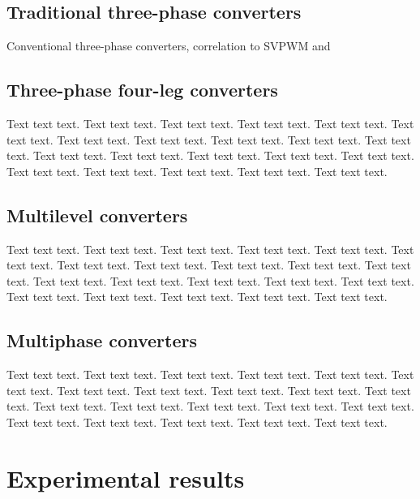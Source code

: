 \documentclass[journal]{IEEEtranTIE}
\theoremstyle{definition}
\begin{document}
\subsection{Traditional three-phase converters}

Conventional three-phase converters, correlation to SVPWM and 

\subsection{Three-phase four-leg converters}

Text text text. Text text text. Text text text. Text text text. Text
text text. Text text text. Text text text. Text text text. Text text
text. Text text text. Text text text. Text text text. Text text text.
Text text text. Text text text. Text text text. Text text text. Text
text text. Text text text. Text text text. Text text text.

\subsection{Multilevel converters}

Text text text. Text text text. Text text text. Text text text. Text
text text. Text text text. Text text text. Text text text. Text text
text. Text text text. Text text text. Text text text. Text text text.
Text text text. Text text text. Text text text. Text text text. Text
text text. Text text text. Text text text. Text text text.

\subsection{Multiphase converters}

Text text text. Text text text. Text text text. Text text text. Text
text text. Text text text. Text text text. Text text text. Text text
text. Text text text. Text text text. Text text text. Text text text.
Text text text. Text text text. Text text text. Text text text. Text
text text. Text text text. Text text text. Text text text.

\section{Experimental results}
\end{document}
